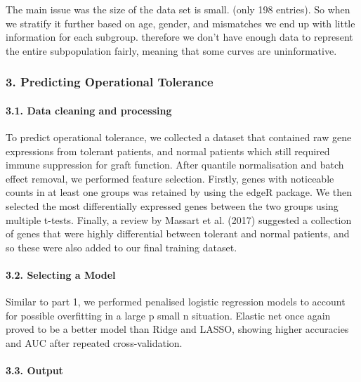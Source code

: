 \documentclass[a4paper,9pt,twocolumn,twoside,]{pinp}
\begin{document}
The main issue was the size of the data set is small. (only 198
entries). So when we stratify it further based on age, gender, and
mismatches we end up with little information for each subgroup.
therefore we don't have enough data to represent the entire
subpopulation fairly, meaning that some curves are uninformative.

\hypertarget{predicting-operational-tolerance}{%
\subsubsection{3. Predicting Operational
Tolerance}\label{predicting-operational-tolerance}}

\hypertarget{data-cleaning-and-processing-2}{%
\paragraph{3.1. Data cleaning and
processing}\label{data-cleaning-and-processing-2}}

To predict operational tolerance, we collected a dataset that contained
raw gene expressions from tolerant patients, and normal patients which
still required immune suppression for graft function. After quantile
normalisation and batch effect removal, we performed feature selection.
Firstly, genes with noticeable counts in at least one groups was
retained by using the edgeR package. We then selected the most
differentially expressed genes between the two groups using multiple
t-tests. Finally, a review by Massart et al. (2017) suggested a
collection of genes that were highly differential between tolerant and
normal patients, and so these were also added to our final training
dataset.

\hypertarget{selecting-a-model-1}{%
\paragraph{3.2. Selecting a Model}\label{selecting-a-model-1}}

Similar to part 1, we performed penalised logistic regression models to
account for possible overfitting in a large p small n situation. Elastic
net once again proved to be a better model than Ridge and LASSO, showing
higher accuracies and AUC after repeated cross-validation.

\hypertarget{output-2}{%
\paragraph{3.3. Output}\label{output-2}}
\end{document}
